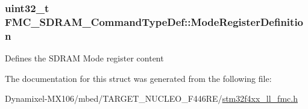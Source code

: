 \subsubsection[{\texorpdfstring{Mode\+Register\+Definition}{ModeRegisterDefinition}}]{\setlength{\rightskip}{0pt plus 5cm}uint32\+\_\+t F\+M\+C\+\_\+\+S\+D\+R\+A\+M\+\_\+\+Command\+Type\+Def\+::\+Mode\+Register\+Definition}\hypertarget{struct_f_m_c___s_d_r_a_m___command_type_def_ab50d70f643184b7d297f7bd3569b20d7}{}\label{struct_f_m_c___s_d_r_a_m___command_type_def_ab50d70f643184b7d297f7bd3569b20d7}
Defines the S\+D\+R\+AM Mode register content 

The documentation for this struct was generated from the following file\+:\begin{DoxyCompactItemize}
\item 
Dynamixel-\/\+M\+X106/mbed/\+T\+A\+R\+G\+E\+T\+\_\+\+N\+U\+C\+L\+E\+O\+\_\+\+F446\+R\+E/\hyperlink{stm32f4xx__ll__fmc_8h}{stm32f4xx\+\_\+ll\+\_\+fmc.\+h}\end{DoxyCompactItemize}

